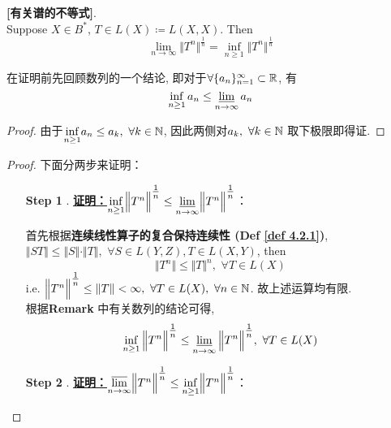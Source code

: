 	\begin{thm}\label{thm 4.4.1}
		\textbf{[有关谱的不等式]}. \\
		Suppose $X \in B^*$, $T \in L(X) \coloneqq L(X , X)$. Then
		\[ \lim_{n \to \infty} \Big\Vert T^n \Big\Vert^{\tfrac{1}{n}} = \inf_{n \geq 1} \Big\Vert T^n \Big\Vert^{\tfrac{1}{n}} \]
		
		\vspace*{4em}
		
		\begin{rmk}
			在证明前先回顾数列的一个结论, 即对于$\forall \{ a_n \}_{n = 1}^{\infty} \subset \mathbb{R}$, 有
			\[ \inf_{n \geq 1} a_n \leq \varliminf_{n \to \infty} a_n \]
			\begin{proof}
				由于$\underset{n \geq 1}{\inf} a_n \leq a_k , \,\, \forall k \in \mathbb{N}$, 因此两侧对$a_k , \,\, \forall k \in \mathbb{N}$ 取下极限即得证. 
			\end{proof}
		\end{rmk}
		
		\vspace*{6em}
		
		\begin{proof}
			下面分两步来证明：
			\begin{enumerate}
				\item[\textbf{Step 1}]. \underline{\textbf{证明：$\underset{n \geq 1}{\inf} \Big\Vert T^n \Big\Vert^{\tfrac{1}{n}} \leq \underset{n \to \infty}{\varliminf} \Big\Vert T^n \Big\Vert^{\tfrac{1}{n}}$}}：
				
				\vspace*{1em}
				
				首先根据\textbf{连续线性算子的复合保持连续性 (Def \ref{def 4.2.1})}, $\Vert ST \Vert \leq \Vert S \Vert \cdot \Vert T \Vert , \,\, \forall S \in L(Y , Z) , T \in L(X , Y)$, then
				\[ \Vert T^n \Vert \leq \Vert T \Vert^n , \,\, \forall T \in L(X) \]
				i.e. $\Big\Vert T^n \Big\Vert^{\tfrac{1}{n}} \leq \Vert T \Vert < \infty , \,\, \forall T \in L(X) , \,\, \forall n \in \mathbb{N}$. 故上述运算均有限. \\
				根据\textbf{Remark} 中有关数列的结论可得, 
				\[ \inf_{n \geq 1} \Big\Vert T^n \Big\Vert^{\tfrac{1}{n}} \leq \varliminf_{n \to \infty} \Big\Vert T^n \Big\Vert^{\tfrac{1}{n}} , \,\, \forall T \in L(X) \]
				
				\newpage
				
				\item[\textbf{Step 2}]. \underline{\textbf{证明：$\underset{n \to \infty}{\varlimsup} \Big\Vert T^n \Big\Vert^{\tfrac{1}{n}} \leq \underset{n \geq 1}{\inf} \Big\Vert T^n \Big\Vert^{\tfrac{1}{n}}$}}：
				

\end{enumerate}
\end{proof}
\end{thm}
